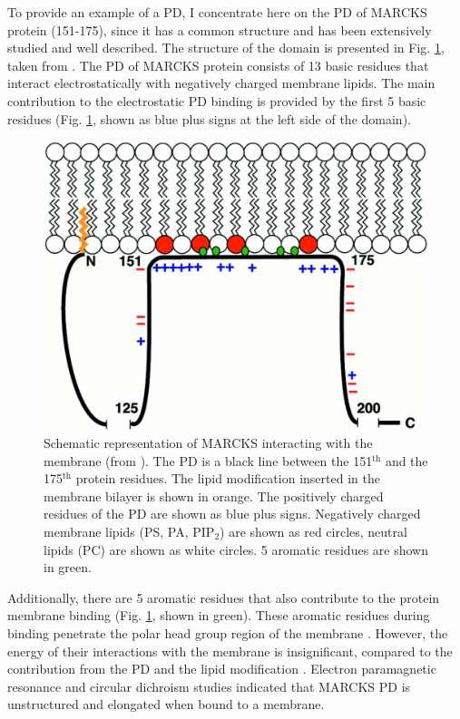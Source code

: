 To provide an example of a PD, I concentrate here on the PD of MARCKS protein (151-175), since it has a common structure and has been extensively studied and well described. The structure of the domain is presented in Fig. \ref{fig:PD}, taken from \cite{Wang2001}. The PD of MARCKS protein consists of 13 basic residues that interact electrostatically with negatively charged membrane lipids. The main contribution to the electrostatic PD binding is provided by the first 5 basic residues \cite{Denisov1998} (Fig. \ref{fig:PD}, shown as blue plus signs at the left side of the domain).
\begin{figure}[!ht]
\begin{center}
  \includegraphics[scale=0.25]{../figures/PD.pdf}
\end{center}
 \caption[Schematic representation of MARCKS interacting with the membrane]{Schematic representation of MARCKS interacting with the membrane (from \cite{Wang2001}). The PD is a black line between the 151$^{\text{th}}$ and the 175$^{\text{th}}$ protein residues. The lipid modification inserted in the membrane bilayer is shown in orange. The positively charged residues of the PD are shown as blue plus signs. Negatively charged membrane lipids (PS, PA, PIP$_2$) are shown as red circles, neutral lipids (PC) are shown as white circles. 5 aromatic residues are shown in green.}
\label{fig:PD}
\end{figure}
Additionally, there are 5 aromatic residues that also contribute to the protein membrane binding (Fig. \ref{fig:PD}, shown in green). These aromatic residues during binding penetrate the polar head group region of the membrane \cite{Arbuzova2000}. However, the energy of their interactions with the membrane is insignificant, compared to the contribution from the PD and the lipid modification \cite{Wang2002,McLaughlin1995}. Electron paramagnetic resonance \cite{Qin1996} and circular dichroism \cite{Wang2001} studies indicated that MARCKS PD is unstructured and elongated when bound to a membrane.



